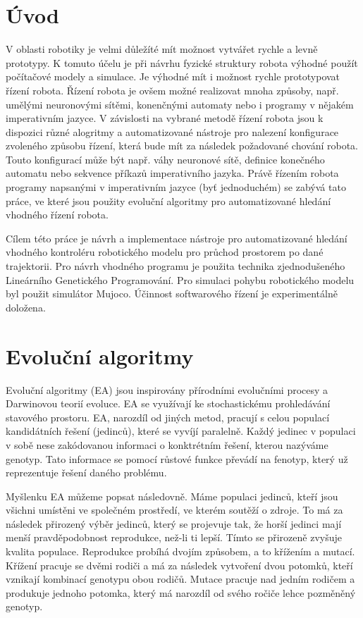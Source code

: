 
\chapter{Úvod}
V oblasti robotiky je velmi důležíté mít možnost vytvářet rychle a levně prototypy.
K tomuto účelu je při návrhu fyzické struktury robota výhodné použít počítačové modely a simulace.
Je výhodné mít i možnost rychle prototypovat řízení robota.
Řízení robota je ovšem možné realizovat mnoha způsoby, např. umělými neuronovými sítěmi, konenčnými automaty nebo i programy v nějakém imperativním jazyce.
V závislosti na vybrané metodě řízení robota jsou k dispozici různé alogritmy a automatizované nástroje pro nalezení konfigurace zvoleného způsobu řízení, která bude mít za následek požadované chování robota.
Touto konfigurací může být např. váhy neuronové sítě, definice konečného automatu nebo sekvence příkazů imperativního jazyka.
Právě řízením robota programy napsanými v imperativním jazyce (byť jednoduchém) se zabývá tato práce, ve které jsou použity evoluční algoritmy pro automatizované hledání vhodného řízení robota.

Cílem této práce je návrh a implementace nástroje pro automatizované hledání vhodného kontroléru robotického modelu pro průchod prostorem po dané trajektorii.
Pro návrh vhodného programu je použita technika zjednodušeného Lineárního Genetického Programování.
Pro simulaci pohybu robotického modelu byl použit simulátor Mujoco.
Účinnost softwarového řízení je experimentálně doložena.

\chapter{Evoluční algoritmy}
Evoluční algoritmy (EA) jsou inspirovány přírodními evolučními procesy a Darwinovou teorií evoluce.
EA se využívají ke stochastickému prohledávání stavového prostoru.
EA, narozdíl od jiných metod, pracují s celou populací kandidátních řešení (jedinců), které se vyvíjí paralelně.
Každý jedinec v populaci v sobě nese zakódovanou informaci o konktrétním řešení, kterou nazýváme genotyp.
Tato informace se pomocí růstové funkce převádí na fenotyp, který už reprezentuje řešení daného problému.

Myšlenku EA můžeme popsat následovně.
Máme populaci jedinců, kteří jsou všichni umístěni ve společném prostředí, ve kterém soutěží o zdroje.
To má za následek přirozený výběr jedinců, který se projevuje tak, že horší jedinci mají menší pravděpodobnost reprodukce, než-li ti lepší.
Tímto se přirozeně zvyšuje kvalita populace.
Reprodukce probíhá dvojím způsobem, a to křížením a mutací.
Křížení pracuje se dvěmi rodiči a má za následek vytvoření dvou potomků, kteří vznikají kombinací genotypu obou rodičů.
Mutace pracuje nad jedním rodičem a produkuje jednoho potomka, který má narozdíl od svého ročiče lehce pozměněný genotyp.

